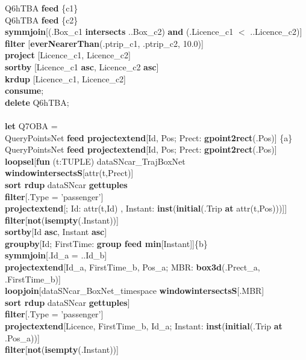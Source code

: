 \documentclass[a4paper]{article}
\newcommand{\op}[1]{\textbf{#1}}
\begin{document}
\begin{scriptsize}
\begin{tabbing}
\>Q6hTBA \op{feed} \{c1\}\\
\>Q6hTBA \op{feed} \{c2\}\\
\>\op{symmjoin}[(.Box\_c1 \op{intersects} ..Box\_c2) \op{and} (.Licence\_c1 $<$ ..Licence\_c2)]\\
\>\op{filter} [\op{everNearerThan}(.ptrip\_c1, .ptrip\_c2, 10.0)]\\
\>\op{project} [Licence\_c1, Licence\_c2]\\
\>\op{sortby} [Licence\_c1 \op{asc}, Licence\_c2 \op{asc}]\\
\>\op{krdup} [Licence\_c1, Licence\_c2]\\
\op{consume};\\
\op{delete} Q6hTBA;\\
\\
\op{let} Q7OBA =\\
\>QueryPointsNet \op{feed projectextend}[Id, Pos; Prect: \op{gpoint2rect}(.Pos)] \{a\}\\
\>QueryPointsNet \op{feed projectextend}[Id, Pos; Prect: \op{gpoint2rect}(.Pos)]\\
\>\>\op{loopsel}[\op{fun} (t:TUPLE) dataSNcar\_TrajBoxNet \op{windowintersectsS}[attr(t,Prect)]\\
\>\>\>\>\op{sort rdup} dataSNcar \op{gettuples}\\
\>\>\>\op{filter}[.Type = 'passenger']\\
\>\>\>\op{projectextend}[; Id: attr(t,Id) , Instant: \op{inst}(\op{initial}(.Trip \op{at} attr(t,Pos)))]]\\
\>\>\>\op{filter}[\op{not}(\op{isempty}(.Instant))]\\
\>\>\>\op{sortby}[Id \op{asc}, Instant \op{asc}]\\
\>\>\>\op{groupby}[Id; FirstTime: \op{group feed min}[Instant]]\{b\}\\
\>\op{symmjoin}[.Id\_a = ..Id\_b]\\
\>\op{projectextend}[Id\_a, FirstTime\_b, Pos\_a; MBR: \op{box3d}(.Prect\_a, .FirstTime\_b)]\\
\>\op{loopjoin}[dataSNcar\_BoxNet\_timespace \op{windowintersectsS}[.MBR]\\
\>\>\>\>\op{sort rdup} dataSNcar \op{gettuples}]\\
\>\op{filter}[.Type = 'passenger']\\
\>\op{projectextend}[Licence, FirstTime\_b, Id\_a; Instant: \op{inst}(\op{initial}(.Trip \op{at} .Pos\_a))]\\
\>\op{filter}[\op{not}(\op{isempty}(.Instant))]\\

\end{tabbing}
\end{scriptsize}
\end{document}
